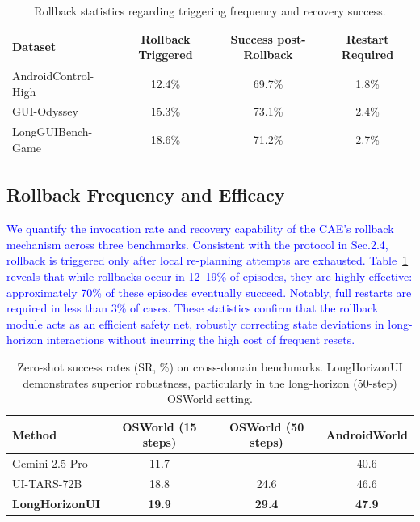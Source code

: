 \documentclass{article} %
\newcommand{\revise}[1]{\textcolor{blue}{#1}}
\begin{document}
\begin{table}[t]
    \centering
    \small %
    \caption{Rollback statistics regarding triggering frequency and recovery success.}
    \label{tab:rollback_stats}
    \setlength{\tabcolsep}{6pt} %
    \begin{tabular}{lccc}
        \toprule
        \textbf{Dataset} & \textbf{Rollback Triggered} & \textbf{Success post-Rollback} & \textbf{Restart Required} \\
        \midrule
        AndroidControl-High & 12.4\% & 69.7\% & 1.8\% \\
        GUI-Odyssey         & 15.3\% & 73.1\% & 2.4\% \\
        LongGUIBench-Game   & 18.6\% & 71.2\% & 2.7\% \\
        \bottomrule
    \end{tabular}
\end{table}

\subsection{Rollback Frequency and Efficacy}
\label{sec:Rollback}
 \revise{We quantify the invocation rate and recovery capability of the CAE's rollback mechanism across three benchmarks. Consistent with the protocol in Sec.2.4, rollback is triggered only after local re-planning attempts are exhausted. Table~\ref{tab:rollback_stats} reveals that while rollbacks occur in 12--19\% of episodes, they are highly effective: approximately 70\% of these episodes eventually succeed. Notably, full restarts are required in less than 3\% of cases. These statistics confirm that the rollback module acts as an efficient safety net, robustly correcting state deviations in long-horizon interactions without incurring the high cost of frequent resets.}

\begin{table}[t]
    \centering
    \small
    \caption{Zero-shot success rates (SR, \%) on cross-domain benchmarks. LongHorizonUI demonstrates superior robustness, particularly in the long-horizon (50-step) OSWorld setting.}
    \label{tab:osworld_androidworld}
    \setlength{\tabcolsep}{6pt}
    \begin{tabular}{lccc}
        \toprule
        \textbf{Method} & \textbf{OSWorld (15 steps)} & \textbf{OSWorld (50 steps)} & \textbf{AndroidWorld} \\
        \midrule
        Gemini-2.5-Pro   & 11.7 & --   & 40.6 \\
        UI-TARS-72B      & 18.8 & 24.6 & 46.6 \\
        \rowcolor{black!4} \textbf{LongHorizonUI} & \textbf{19.9} & \textbf{29.4} & \textbf{47.9} \\
        \bottomrule
    \end{tabular}
\end{table}
\end{document}
